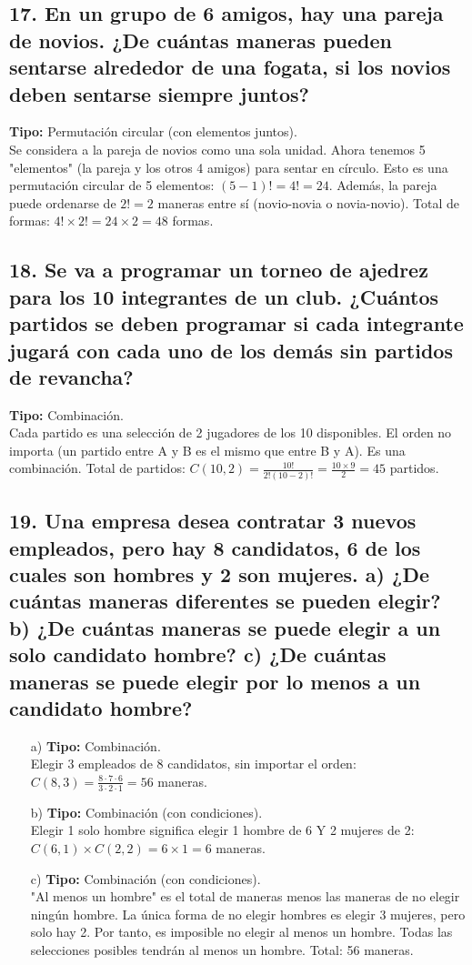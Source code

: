 \documentclass[11pt]{article}
\begin{document}
    \subsection*{17. En un grupo de 6 amigos, hay una pareja de novios. ¿De cuántas maneras pueden sentarse alrededor de una fogata, si los novios deben sentarse siempre juntos?}
    \textbf{Tipo:} Permutación circular (con elementos juntos). \\
    Se considera a la pareja de novios como una sola unidad. Ahora tenemos 5 "elementos" (la pareja y los otros 4 amigos) para sentar en círculo. Esto es una permutación circular de 5 elementos: $(5-1)! = 4! = 24$.
    Además, la pareja puede ordenarse de $2! = 2$ maneras entre sí (novio-novia o novia-novio).
    Total de formas: $4! \times 2! = 24 \times 2 = 48$ formas.
    
    \subsection*{18. Se va a programar un torneo de ajedrez para los 10 integrantes de un club. ¿Cuántos partidos se deben programar si cada integrante jugará con cada uno de los demás sin partidos de revancha?}
    \textbf{Tipo:} Combinación. \\
    Cada partido es una selección de 2 jugadores de los 10 disponibles. El orden no importa (un partido entre A y B es el mismo que entre B y A). Es una combinación.
    Total de partidos: $C(10,2) = \frac{10!}{2!(10-2)!} = \frac{10 \times 9}{2} = 45$ partidos.

    \subsection*{19. Una empresa desea contratar 3 nuevos empleados, pero hay 8 candidatos, 6 de los cuales son hombres y 2 son mujeres. a) ¿De cuántas maneras diferentes se pueden elegir? b) ¿De cuántas maneras se puede elegir a un solo candidato hombre? c) ¿De cuántas maneras se puede elegir por lo menos a un candidato hombre?}
    \begin{itemize}
        \item[a)] \textbf{Tipo:} Combinación. \\
        Elegir 3 empleados de 8 candidatos, sin importar el orden: $C(8,3) = \frac{8 \cdot 7 \cdot 6}{3 \cdot 2 \cdot 1} = 56$ maneras.
        \item[b)] \textbf{Tipo:} Combinación (con condiciones). \\
        Elegir 1 solo hombre significa elegir 1 hombre de 6 Y 2 mujeres de 2: $C(6,1) \times C(2,2) = 6 \times 1 = 6$ maneras.
        \item[c)] \textbf{Tipo:} Combinación (con condiciones). \\
        "Al menos un hombre" es el total de maneras menos las maneras de no elegir ningún hombre. La única forma de no elegir hombres es elegir 3 mujeres, pero solo hay 2. Por tanto, es imposible no elegir al menos un hombre. Todas las selecciones posibles tendrán al menos un hombre. Total: 56 maneras.
    \end{itemize}
\end{document}
